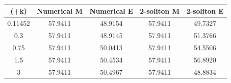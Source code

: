 \documentclass[a4paper,11pt]{article}
\begin{document}
\begin{table}[H]
\center
\begin{tabular}{|c||c|c|c|c||}
\hline 
(+k) & Numerical M & Numerical E&2-soliton M & 2-soliton E \\ 
\hline 
0.11452 & 57.9411 & 48.9154&57.9411 & 49.7327 \\ 
\hline 
0.3 & 57.9411 & 48.9145&57.9411 & 51.3766 \\ 
\hline 
0.75 & 57.9411 & 50.0413&57.9411 & 54.5506 \\ 
\hline 
1.5 & 57.9411 & 50.4534&57.9411 & 56.8920 \\ 
\hline 
3 & 57.9411 & 50.4967&57.9411 & 48.8834 \\ 
\hline 
\end{tabular} 
\end{table}
\end{document}
